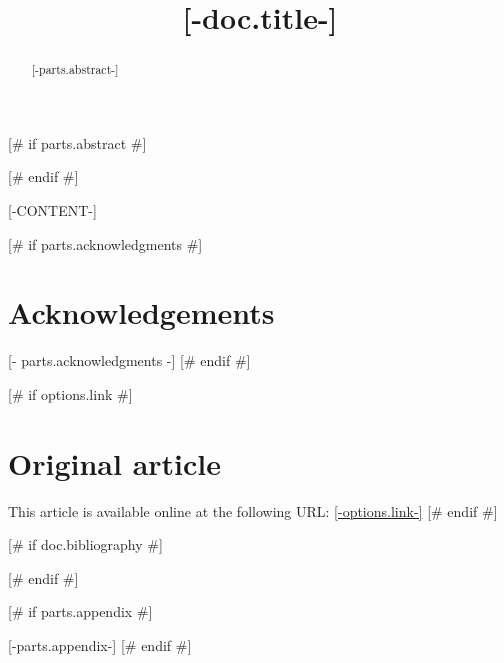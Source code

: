 \documentclass[10pt,twocolumn,letterpaper]{article}
\begin{document}
\title{[-doc.title-]}






\maketitle

[# if parts.abstract #]
\begin{abstract}
[-parts.abstract-]\\


\end{abstract}
[# endif #]



[-CONTENT-]

[# if parts.acknowledgments #]
\section*{Acknowledgements}
\footnotesize
[- parts.acknowledgments -]
\normalsize
[# endif #]

[# if options.link #]
\section*{Original article}
\footnotesize
This article is available online at the following URL: \href{[-options.link-]}{[-options.link-]}
\normalsize
[# endif #]

[# if doc.bibliography #]
{\small


}
[# endif #]



[# if parts.appendix #]
\clearpage

[-parts.appendix-]
[# endif #]
\end{document}
